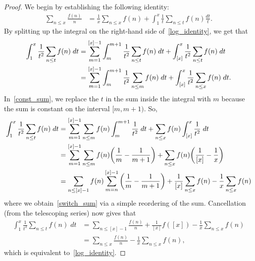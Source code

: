 \documentclass[11pt]{article}
\begin{document}
\begin{proof}
We begin by establishing the following identity:
\begin{align}
\sum_{n\leq x}\frac{f(n)}{n} &= \frac{1}{x}\sum_{n\leq x}f(n)+\int_1^x\frac{1}{t}\sum_{n\leq t}f(n)\frac{dt}{t}.\label{log_identity}
\end{align}
By splitting up the integral on the right-hand side of~\eqref{log_identity}, we get that
\begin{align}
\int_1^x\frac{1}{t^2}\sum_{n\leq t}f(n)\;dt &= \sum_{m=1}^{[x]-1}\int_m^{m+1}\frac{1}{t^2}\sum_{n\leq t}f(n)\;dt+\int_{[x]}^{x}\frac{1}{t^2}\sum_{n\leq t}f(n)\;dt\notag\\
&= \sum_{m=1}^{[x]-1}\int_m^{m+1}\frac{1}{t^2}\sum_{n\leq m}f(n)\;dt+\int_{[x]}^x\frac{1}{t^2}\sum_{n\leq x}f(n)\;dt.\label{const_sum}
\end{align}
In~\eqref{const_sum}, we replace the $t$ in the sum inside the integral with $m$ because the sum is constant on the interval $[m,m+1)$. So,
\begin{align}
\int_1^x\frac{1}{t^2}\sum_{n\leq t}f(n)\;dt &= \sum_{m=1}^{[x]-1}\sum_{n\leq m}f(n)\int_m^{m+1}\frac{1}{t^2}\;dt+\sum_{n\leq x}f(n)\int_{[x]}^x\frac{1}{t^2}\;dt\notag\\
&= \sum_{m=1}^{[x]-1}\sum_{n\leq m}f(n)\bigg(\frac{1}{m}-\frac{1}{m+1}\bigg)+\sum_{n\leq x}f(n)\bigg(\frac{1}{[x]}-\frac{1}{x}\bigg)\notag\\
&= \sum_{n\leq [x]-1}f(n)\sum_{m=n}^{[x]-1}\bigg(\frac{1}{m}-\frac{1}{m+1}\bigg)+\frac{1}{[x]}\sum_{n\leq x}f(n)-\frac{1}{x}\sum_{n\leq x}f(n)\label{switch_sum}
\end{align}
where we obtain~\eqref{switch_sum} via a simple reordering of the sum. Cancellation (from the telescoping series) now gives that
\begin{align*}
\int_1^x\frac{1}{t^2}\sum_{n\leq t}f(n)\;dt &= \sum_{n\leq [x]-1}\frac{f(n)}{n}+\frac{1}{[x]}f([x])-\frac{1}{x}\sum_{n\leq x}f(n)\\
&= \sum_{n\leq x}\frac{f(n)}{n}-\frac{1}{x}\sum_{n\leq x}f(n),
\end{align*}
which is equivalent to~\eqref{log_identity}.


\end{proof}
\end{document}
